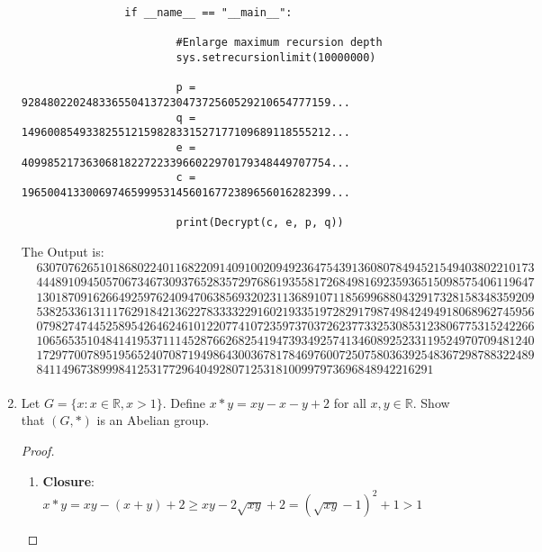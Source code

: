 \documentclass{article}
\theoremstyle{break}
\begin{document}
\begin{enumerate}
\begin{lstlisting}
                if __name__ == "__main__":

                        #Enlarge maximum recursion depth 
                        sys.setrecursionlimit(10000000)  

                        p = 928480220248336550413723047372560529210654777159...
                        q = 149600854933825512159828331527177109689118555212...
                        e = 409985217363068182272233966022970179348449707754...
                        c = 196500413300697465999531456016772389656016282399...
                        
                        print(Decrypt(c, e, p, q))
        \end{lstlisting}
        The Output is:\\
        \[
               \begin{aligned}
                &6307076265101868022401168220914091002094923647543913608078494521549403802210173\\
                &4448910945057067346730937652835729768619355817268498169235936515098575406119647\\
                &1301870916266492597624094706385693202311368910711856996880432917328158348359209\\
                &5382533613111762918421362278333322916021933519728291798749842494918068962745956\\
                &0798274744525895426462461012207741072359737037262377332530853123806775315242266\\
                &1065653510484141953711145287662682541947393492574134608925233119524970709481240\\
                &1729770078951956524070871949864300367817846976007250758036392548367298788322489\\
                &841149673899984125317729640492807125318100997973696848942216291\\                
               \end{aligned} 
        \]
        \newpage
        \item Let $G= \{ x:x \in \mathbb{R}, x >1\}$.  Define $x * y=xy−x−y+ 2$ for all $x, y \in \mathbb{R}$.  Show that $(G, *)$ is an Abelian group.
        \begin{proof}
                \begin{enumerate}
                        \item 
                        \textbf{Closure}: \\
                        $x*y = xy - (x+y) + 2 \geq xy - 2\sqrt{xy}+2 = (\sqrt{xy}-1)^2+1>1$

\end{enumerate}
\end{proof}
\end{enumerate}
\end{document}
